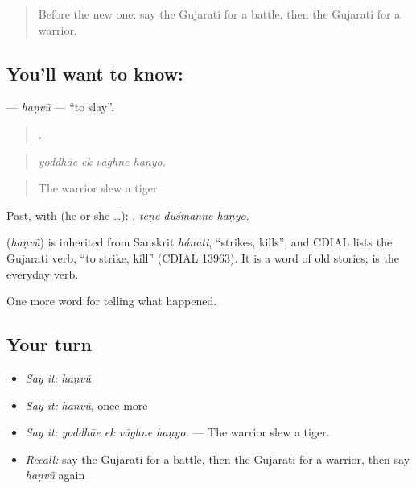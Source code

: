 \begin{quote}
Before the new one: say the Gujarati for a battle, then the Gujarati for a warrior.
\end{quote}

\subsection*{You'll want to know: }
\textbf{} — \emph{haṇvũ} — \textquotedblleft{}to slay\textquotedblright{}.

\begin{quote}
   .
\end{quote}

\begin{quote}
\emph{yoddhāe ek vāghne haṇyo.}
\end{quote}

\begin{quote}
The warrior slew a tiger.
\end{quote}

Past, with  (he or she …):   , \emph{teṇe duśmanne haṇyo}.

\begin{cousinweb}
\textbf{} (\emph{haṇvũ}) is inherited from Sanskrit \emph{hánati}, \textquotedblleft{}strikes, kills\textquotedblright{}, and CDIAL lists the Gujarati verb, \textquotedblleft{}to strike, kill\textquotedblright{} (CDIAL 13963). It is a word of old stories; \textbf{} is the everyday verb.
\end{cousinweb}

\begin{grammarlens}[title={What you've built}]
One more word for telling what happened.
\end{grammarlens}

\subsection*{Your turn}
\begin{itemize}
\raggedright
  \item \emph{Say it:} \emph{haṇvũ}
  \item \emph{Say it:} \emph{haṇvũ}, once more
  \item \emph{Say it:} \emph{yoddhāe ek vāghne haṇyo.} — The warrior slew a tiger.
  \item \emph{Recall:} say the Gujarati for a battle, then the Gujarati for a warrior, then say \emph{haṇvũ} again
\end{itemize}

